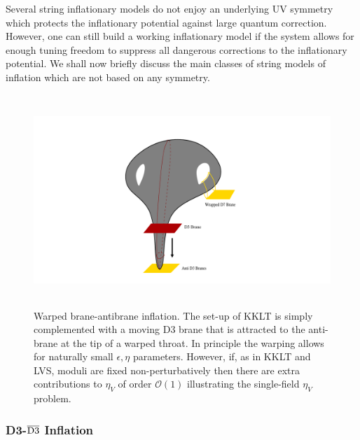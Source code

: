Several string inflationary models do not enjoy an underlying UV symmetry which protects the inflationary potential against large quantum correction. However, one can still build a working inflationary model if the system allows for enough tuning freedom to suppress all dangerous corrections to the inflationary potential. We shall now briefly discuss the main classes of string models of inflation which are not based on any symmetry.

\begin{figure}[t]
\begin{center}
\includegraphics[width=130mm,height=80mm]{Sections/Figures/BraneInflation.pdf} 
\caption{Warped brane-antibrane inflation. The set-up of KKLT is simply complemented with a moving D3 brane that is attracted to the anti-brane at the tip of a warped throat. In principle the warping allows for naturally small $\epsilon, \eta$ parameters. However, if, as in KKLT and LVS, moduli are fixed non-perturbatively then there are extra contributions to $\eta_V$ of order $\mathcal{O}(1)$ illustrating the single-field $\eta_V$ problem.} 
\label{Fig:KKLMMT} 
\end{center}
\end{figure}

\subsubsection*{{\rm D3}-$\overline{\rm D3}$ Inflation}


